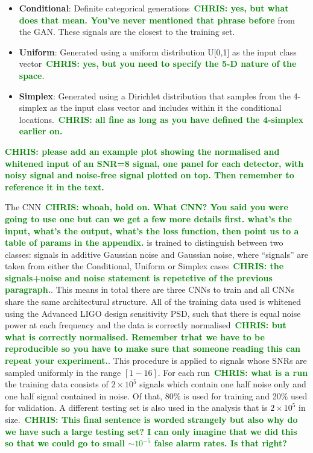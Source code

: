 \documentclass[12pt]{iopart}
\newcommand{\chris}[1]{\textbf{\textcolor{green}{CHRIS: #1}}}
\begin{document}
\begin{itemize}
%
\item {\bf Conditional}: Definite categorical generations~\chris{yes, but what
does that mean. You've never mentioned that phrase before} from the \ac{GAN}.
These signals are the closest to the training set.
%
\item {\bf Uniform}: Generated using a uniform distribution U[0,1] as the input
class vector~\chris{yes, but you need to specify the 5-D nature of the space}.
%
\item {\bf Simplex}: Generated using a Dirichlet distribution that samples from the
4-simplex as the input class vector and includes within it the conditional
locations.~\chris{all fine as long as you have defined the 4-simplex earlier
on.} 
%
\end{itemize}

\chris{please add an example plot showing the normalised and whitened input of
an SNR=8 signal, one panel for each detector, with noisy signal and noise-free
signal plotted on top. Then remember to reference it in the text.}

The CNN~\chris{whoah, hold on. What CNN? You said you were going to use one but
can we get a few more details first. what's the input, what's the output,
what's the loss function, then point us to a table of params in the appendix.}
is trained to distinguish between two classes: signals in additive Gaussian
noise and Gaussian noise, where “signals” are taken from either the
Conditional, Uniform or Simplex cases~\chris{the signals+noise and noise
statement is repetetive of the previous paragraph.}. This means in total there
are three \acp{CNN} to train and all \acp{CNN} share the same architectural
structure. All of the training data used is whitened using the Advanced LIGO
design sensitivity \ac{PSD}, such that there is equal noise power at each
frequency and the data is correctly normalised~\chris{but what is correctly
normalised. Remember trhat we have to be reproducible so you have to make sure
that someone reading this can repeat your experiment.}. This procedure is
applied to signals whose \acp{SNR} are sampled uniformly in the range $[1-16]$.
For each run~\chris{what is a run} the training data consists of $2\times 10^5$
signals which contain one half noise only and one half signal contained in
noise. Of that, 80\% is used for training and 20\% used for validation. A
different testing set is also used in the analysis that is $2\times 10^5$ in
size.~\chris{This final sentence is worded strangely but also why do we have
such a large testing set? I can only imagine that we did this so that we could
go to small $\sim 10^{-5}$ false alarm rates. Is that right?} 
\end{document}

